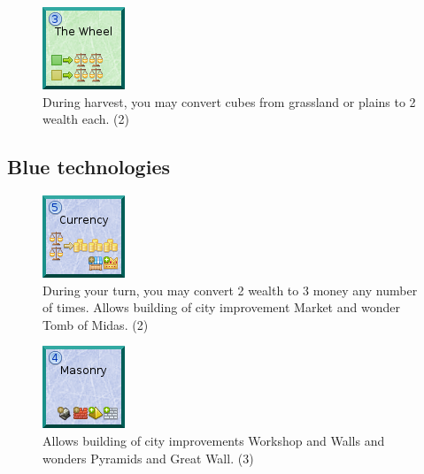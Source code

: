 \documentclass[11pt,a4paper,titlepage]{article}
\begin{document}
{{  \begin{figure}[!htb]
    \begin{minipage}[c]{0.1\textwidth}
      \includegraphics[scale=.7]{doe_tech_wheel.png}
    \end{minipage}\hfill
    \begin{minipage}[c]{0.6\textwidth}
      \captionsetup{labelformat=empty, justification=justified, singlelinecheck=false}
      \caption{During harvest, you may convert cubes from grassland or plains to 2 wealth each. (2)}
    \end{minipage}\hfill
    \label{fig:tech_wheel}
  \end{figure}

  }\label{subsec:green_technologies}
  \newpage
  \subsection{Blue technologies}{

  \begin{figure}[!htb]
    \begin{minipage}[c]{0.1\textwidth}
      \includegraphics[scale=.7]{doe_tech_currency.png}
    \end{minipage}\hfill
    \begin{minipage}[c]{0.6\textwidth}
      \captionsetup{labelformat=empty, justification=justified, singlelinecheck=false}
      \caption{During your turn, you may convert 2 wealth to 3 money any number of times. Allows building of city improvement Market and wonder Tomb of Midas. (2)}
    \end{minipage}\hfill
    \label{fig:tech_currency}
  \end{figure}

  \begin{figure}[!htb]
    \begin{minipage}[c]{0.1\textwidth}
      \includegraphics[scale=.7]{doe_tech_masonry.png}
    \end{minipage}\hfill
    \begin{minipage}[c]{0.6\textwidth}
      \captionsetup{labelformat=empty, justification=justified, singlelinecheck=false}
      \caption{Allows building of city improvements Workshop and Walls and wonders Pyramids and Great Wall. (3)}
    \end{minipage}\hfill
    \label{fig:tech_masonry}
  \end{figure}

}}
\end{document}
